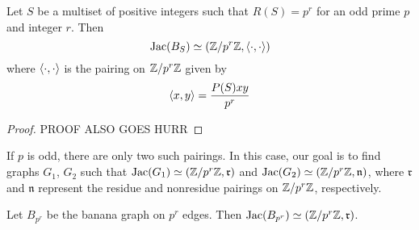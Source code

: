 \documentclass{amsart}
\begin{document}
\begin{prop}
  \label{prop:banana_pairing}
  Let $S$ be a multiset of positive integers such that $R(S) = p^r$
  for an odd prime $p$ and integer $r$. Then
  \begin{equation*}
    \operatorname{Jac}(B_S) \simeq (\mathbb{Z}/p^r\mathbb{Z}, \langle \cdot, \cdot \rangle)
  \end{equation*}
  where $\langle \cdot, \cdot \rangle$ is the pairing on $\mathbb{Z}/p^r\mathbb{Z}$ given by
  \begin{equation*}
    \langle x, y \rangle = \frac{P(S)xy}{p^r}
  \end{equation*}
\end{prop}
\begin{proof}
  PROOF ALSO GOES HURR
\end{proof}

If $p$ is odd, there are only two such pairings. In this case, our
goal is to find graphs $G_1$, $G_2$ such that $\operatorname{Jac}(G_1) \simeq
(\mathbb{Z}/p^r\mathbb{Z}, \mathfrak{r})$ and $\operatorname{Jac}(G_2) \simeq (\mathbb{Z}/p^r\mathbb{Z},
\mathfrak{n})$, where $\mathfrak{r}$ and $\mathfrak{n}$ represent the
residue and nonresidue pairings on $\mathbb{Z}/p^r\mathbb{Z}$, respectively. 

\begin{prop}
  \label{prop:banana_residue}
  Let $B_{p^r}$ be the banana graph on $p^r$ edges. Then
  $\operatorname{Jac}(B_{p^r}) \simeq (\mathbb{Z}/p^r\mathbb{Z}, \mathfrak{r})$.
\end{prop}
\end{document}
